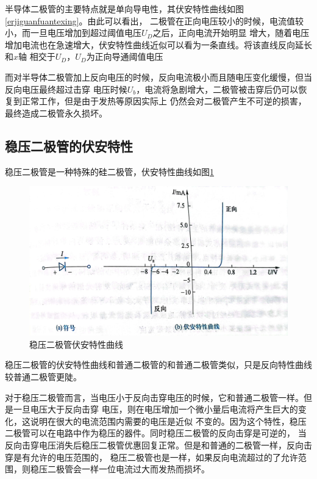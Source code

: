 \documentclass{ctexart}
\begin{document}
    半导体二极管的主要特点就是单向导电性，其伏安特性曲线如图\ref{erjiguanfuantexing}。由此可以看出，
    二极管在正向电压较小的时候，电流值较小，而一旦电压增加到超过阈值电压$U_{D}$之后，正向电流开始明显
    增大，随着电压增加电流也在急速增大，伏安特性曲线近似可以看为一条直线。将该直线反向延长和$x$轴
    相交于$U_{D}$，$U_{D}$为正向导通阈值电压

    而对半导体二极管加上反向电压的时候，反向电流极小而且随电压变化缓慢，但当反向电压最终超过击穿
    电压时候$U_{b}$，电流将急剧增大，二极管被击穿后仍可以恢复到正常工作，但是由于发热等原因实际上
    仍然会对二极管产生不可逆的损害，最终造成二极管永久损坏。

  \subsection{稳压二极管的伏安特性}
  稳压二极管是一种特殊的硅二极管，伏安特性曲线如图\ref{wenyafuantexing}
  \begin{figure}[tbh]
    \centering
    \includegraphics[width=1\textwidth]{wenyafuantexing.jpg}
    \caption{稳压二极管伏安特性曲线}\label{wenyafuantexing}
  \end{figure}
  稳压二极管的伏安特性曲线和普通二极管的和普通二极管类似，只是反向特性曲线较普通二极管更陡。

  对于稳压二极管而言，当电压小于反向击穿电压的时候，它和普通二极管一样。但是一旦电压大于反向击穿
  电压，则在电压增加一个微小量后电流将产生巨大的变化，这说明在很大的电流范围内需要的电压是近似
  不变的。因为这个特性，稳压二极管可以在电路中作为稳压的器件。同时稳压二极管的反向击穿是可逆的，
  当反向击穿电压消失后稳压二极管优惠回复正常。但是和普通的二极管一样，反向击穿是有允许的电压范围的，
  稳压二极管也是一样，如果反向电流超过的了允许范围，则稳压二极管会一样一位电流过大而发热而损坏。
  
\end{document}
